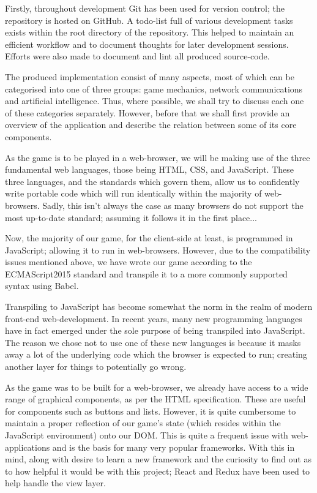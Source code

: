 \documentclass{standalone}
\begin{document}
	Firstly, throughout development Git has been used for version control; the repository is hosted on GitHub\parencite{TronGitRepo}. A todo-list full of various development tasks exists within the root directory of the repository. This helped to maintain an efficient workflow and to document thoughts for later development sessions. Efforts were also made to document and lint all produced source-code.

	The produced implementation consist of many aspects, most of which can be categorised into one of three groups: game mechanics, network communications and artificial intelligence. Thus, where possible, we shall try to discuss each one of these categories separately. However, before that we shall first provide an overview of the application and describe the relation between some of its core components.

	As the game is to be played in a web-browser, we will be making use of the three fundamental web languages, those being HTML, CSS, and JavaScript. These three languages, and the standards which govern them, allow us to confidently write portable code which will run identically within the majority of web-browsers. Sadly, this isn't always the case as many browsers do not support the most up-to-date standard; assuming it follows it in the first place...

	Now, the majority of our game, for the client-side at least, is programmed in JavaScript; allowing it to run in web-browsers. However, due to the compatibility issues mentioned above, we have wrote our game according to the ECMAScript2015 standard \parencite{ECMAScript2015} and transpile it to a more commonly supported syntax using Babel\parencite{Babel}.

	Transpiling to JavaScript has become somewhat the norm in the realm of modern front-end web-development. In recent years, many new programming languages have in fact emerged under the sole purpose of being transpiled into JavaScript. The reason we chose not to use one of these new languages is because it masks away a lot of the underlying code which the browser is expected to run; creating another layer for things to potentially go wrong.

	As the game was to be built for a web-browser, we already have access to a wide range of graphical components, as per the HTML specification. These are useful for components such as buttons and lists. However, it is quite cumbersome to maintain a proper reflection of our game's state (which resides within the JavaScript environment) onto our DOM. This is quite a frequent issue with web-applications and is the basis for many very popular frameworks. With this in mind, along with desire to learn a new framework and the curiosity to find out as to how helpful it would be with this project; React\parencite{React} and Redux\parencite{Redux} have been used to help handle the view layer.
\end{document}

